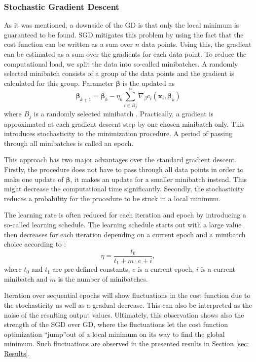 \documentclass{emulateapj}
\begin{document}
\subsubsection{Stochastic Gradient Descent}
\label{subsubsec: SGD}

As it was mentioned, a downside of the GD is that only the local minimum is guaranteed to be found. SGD mitigates this problem by using the fact that the cost function can be written as a sum over $n$ data points. Using this, the gradient can be estimated as a sum over the gradients for each data point. To reduce the computational load, we split the data into so-called minibatches. A randomly selected minibatch consists of a group of the data points and the gradient is calculated for this group. Parameter $\boldsymbol{\beta}$ is the updated as
\begin{equation}
    \boldsymbol{\beta}_{k+1} = \boldsymbol{\beta}_k - \eta_k \sum_{i\in B_j }^{n}  \nabla_\beta c_i(\mathbf{x}_i, \boldsymbol{\beta}_k)
\end{equation}
 where $B_j$ is a randomly selected minibatch \cite{Morten}. Practically, a gradient is approximated at each gradient descent step by one chosen minibatch only. This introduces stochasticity to the minimization procedure. A period of passing through all minibatches is called an epoch. 
 
 
 This approach has two major advantages over the standard gradient descent. Firstly, the procedure does not have to pass through all data points in order to make one update of $\boldsymbol{\beta}$, it makes an update for a smaller minibatch instead. This might decrease the computational time significantly. Secondly, the stochasticity reduces a probability for the procedure to be stuck in a local minimum.
 
 
 The learning rate is often reduced for each iteration and epoch by introducing a so-called learning schedule. The learning schedule starts out with a large value then decreases for each iteration depending on a current epoch and a minibatch choice according to \cite{Morten}:
 \begin{equation}
     \eta=\frac{t_0}{t_1+m\cdot e+i},
 \end{equation}
 where $t_0$ and $t_1$ are pre-defined constants, $e$ is a current epoch, $i$ is a current minibatch and $m$ is the number of minibatches.
 
 
 Iteration over sequential epochs will show fluctuations in the cost function due to the stochasticity as well as a gradual decrease. This can also be interpreted as the noise of the resulting output values. Ultimately, this observation shows also the strength of the SGD over GD, where the fluctuations let the cost function optimization \textquotedblleft jump\textquotedblright out of a local minimum on its way to find the global minimum. Such fluctuations are observed in the presented results in Section \ref{sec: Results}.
\end{document}
